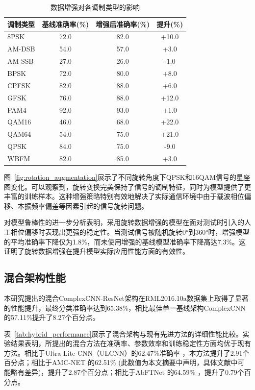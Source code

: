 \documentclass[conference]{IEEEtran}
\begin{document}
\begin{table}[h]
\centering
\caption{数据增强对各调制类型的影响}
\label{tab:data_augmentation_results}
\begin{tabular}{@{}lccc@{}}
\toprule
调制类型 & 基线准确率(\%) & 增强后准确率(\%) & 提升(\%) \\
\midrule
8PSK     & 72.0  & 82.0  & +10.0 \\
AM-DSB   & 54.0  & 57.0  & +3.0  \\
AM-SSB   & 27.0  & 26.0  & -1.0  \\
BPSK    
 & 72.0  & 80.0  & +8.0  \\
CPFSK    & 82.0  & 88.0  & +6.0  \\
GFSK     & 76.0  & 88.0  & +12.0 \\
PAM4     & 92.0  & 93.0  & +1.0  \\
QAM16    & 46.0  & 68.0  & +22.0 \\
QAM64    & 54.0  & 75.0  & +21.0 \\
QPSK     & 84.0  & 75.0  & -9.0  \\ %
WBFM     & 82.0  & 85.0  & 
+3.0  \\
\bottomrule
\end{tabular}
\end{table}

图~\ref{fig:rotation_augmentation}展示了不同旋转角度下QPSK和16QAM信号的星座图变化。可以观察到，旋转变换完美保持了信号的调制特征，同时为模型提供了更丰富的训练样本。这种增强策略特别有效地解决了实际通信环境中由于载波相位偏移、本振频率偏差等因素引起的信号旋转问题。

对模型鲁棒性的进一步分析表明，采用旋转数据增强的模型在面对测试时引入的人工相位偏移时表现出更强的稳定性。当测试信号被随机旋转0°到360°时，增强模型的平均准确率下降仅为1.8\%，而未使用增强的基线模型准确率下降高达7.3\%。这证明了旋转数据增强在提升模型实际应用性能方面的有效性。

\subsection{混合架构性能}

本研究提出的混合ComplexCNN-ResNet架构在RML2016.10a数据集上取得了显著的性能提升，最终分类准确率达到65.38\%，相比最佳单一基线架构ComplexCNN的57.11\%提升了8.27个百分点。

表~\ref{tab:hybrid_performance}展示了混合架构与现有先进方法的详细性能比较。实验结果表明，所提出的混合方法在准确率、参数效率和训练稳定性方面均优于现有方法。相比于Ultra Lite CNN（ULCNN）\cite{b1}的62.47\%准确率 \cite{[23]}\cite{[48]}，本方法提升了2.91个百分点；相比于AMC-NET \cite{b2}的62.51\% (此数值为本文摘要中声明，具体文献中可能略有差异)，提升了2.87个百分点；相比于AbFTNet \cite{b3}的64.59\% \cite{[38]}\cite{[41]}，提升了0.79个百分点。
\end{document}
